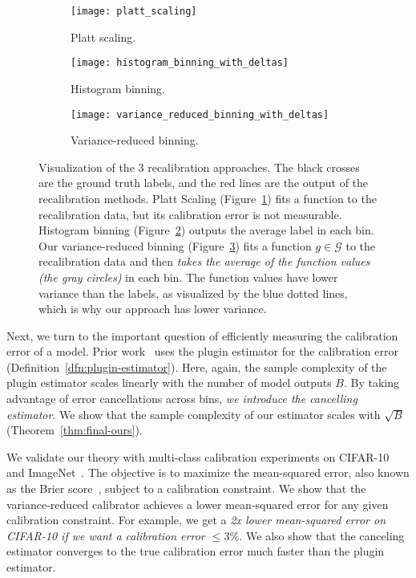 \begin{figure}
     \centering
     \begin{subfigure}[b]{0.32\textwidth}
         \centering
         \texttt{[image: platt\_scaling]}
         \caption{Platt scaling.}
         \label{fig:platt_scaling}
     \end{subfigure}
     \hfill
     \begin{subfigure}[b]{0.32\textwidth}
         \centering
         \texttt{[image: histogram\_binning\_with\_deltas]}
         \caption{Histogram binning.}
         \label{fig:hist_binning}
     \end{subfigure}
     \hfill
     \begin{subfigure}[b]{0.32\textwidth}
         \centering
         \texttt{[image: variance\_reduced\_binning\_with\_deltas]}
         \caption{Variance-reduced binning.}
         \label{fig:var_red_binning}
     \end{subfigure}
        \caption{
        Visualization of the 3 recalibration approaches.
        The black crosses are the ground truth labels, and the red lines are the output of the recalibration methods.
        Platt Scaling (Figure~\ref{fig:platt_scaling}) fits a function to the recalibration data, but its calibration error is not measurable.
        Histogram binning (Figure~\ref{fig:hist_binning}) outputs the average label in each bin.
        Our variance-reduced binning (Figure~\ref{fig:var_red_binning}) fits a function $g \in \mathcal{G}$ to the recalibration data and then \emph{takes the average of the function values (the gray circles)} in each bin.
        The function values have lower variance than the labels, as visualized by the blue dotted lines, which is why our approach has lower variance. 
        }
        \label{fig:variance_reduced_illustration}
\end{figure}

Next, we turn to the important question of efficiently measuring the calibration error of a model.
Prior work~\cite{nguyen2015posterior, guo2017calibration, hendrycks2019anomaly, kuleshov2015calibrated, hendrycks2019pretraining} uses the plugin estimator for the calibration error (Definition~\ref{dfn:plugin-estimator}).
Here, again, the sample complexity of the plugin estimator scales linearly with the number of model outputs $B$.
By taking advantage of error cancellations across bins, \emph{we introduce the cancelling estimator}.
We show that the sample complexity of our estimator scales with $\sqrt{B}$ (Theorem~\ref{thm:final-ours}).

We validate our theory with multi-class calibration experiments on CIFAR-10~\cite{krizhevsky2009learningmultiple} and ImageNet~\cite{deng2009imagenet}.
The objective is to maximize the mean-squared error, also known as the Brier score~\cite{brier1950verification}, subject to a calibration constraint.
We show that the variance-reduced calibrator achieves a lower mean-squared error for any given calibration constraint.
For example, we get a \emph{2x lower mean-squared error on CIFAR-10 if we want a calibration error $\leq 3\%$.}
We also show that the canceling estimator converges to the true calibration error much faster than the plugin estimator.

